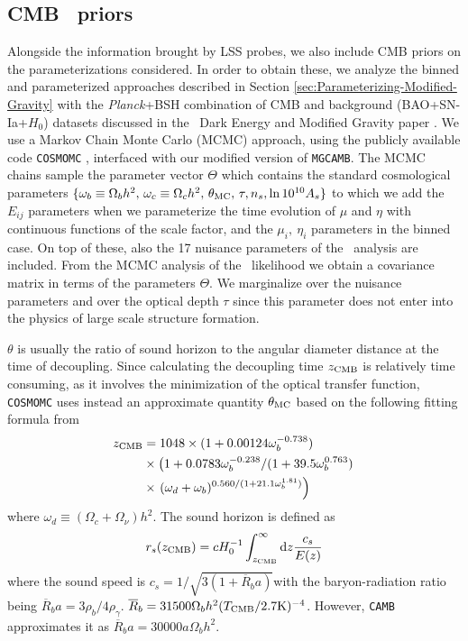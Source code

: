 \subsection{CMB \planck\ priors}
\label{sub:Fisher-Planck}
Alongside the information brought by LSS probes,
we also include CMB priors on the parameterizations considered. In
order to obtain these, we analyze the binned and parameterized approaches
described in Section \ref{sec:Parameterizing-Modified-Gravity} with
the {\it Planck}+BSH combination of CMB and background (BAO+SN-Ia+$H_{0}$)
datasets discussed in the \planck\ Dark Energy and Modified Gravity paper
\cite{planck_collaboration_planck_2016}.
We use a Markov Chain Monte Carlo (MCMC) approach, using the publicly
available code \texttt{COSMOMC} \cite{lewis_cosmological_2002,lewis_efficient_2013},
interfaced with our modified version of \texttt{MGCAMB}. The MCMC
chains sample the parameter vector $\Theta$ which contains the standard
cosmological parameters
$\{\omega_{b}\equiv\Omega_{b}h^{2},\,\omega_{c}\equiv\Omega_{c}h^{2},\,\theta_{\rm MC},\,\tau,n_{s},\ln{10^{10}A_{s}}\}$
to which we add the $E_{ij}$ parameters when we parameterize the time
evolution of $\mu$ and $\eta$ with continuous functions of the scale factor, 
and the $\mu_{i},\ \eta_{i}$ parameters in the binned
case. On top of these, also the 17 nuisance parameters of the \planck\
analysis are included. From the MCMC analysis of the \planck\ likelihood
we obtain a covariance matrix in terms of the parameters $\Theta$.
We marginalize over the nuisance parameters and over the optical
depth $\tau$ since this parameter does not enter into
the physics of large scale structure formation.

$\theta$ is usually the ratio of sound horizon
to the angular diameter distance at the time of decoupling. Since
calculating the decoupling time $z_{\rm CMB}$ is relatively time consuming,
as it involves the minimization of the optical transfer function,
\texttt{COSMOMC} uses instead an approximate quantity $\theta_{\rm MC}$
based on the following fitting formula from \cite{hu_small_1996}
\begin{align}
z_{\rm CMB} & =1048\times(1+0.00124\omega_{b}^{-0.738})\nonumber \\
 &
\times\left(1+0.0783\omega_{b}^{-0.238}/(1+39.5\omega_{b}^{0.763})\right.\nonumber
\\
 & \times\left.(\omega_{d}+\omega_{b})^{0.560/(1+21.1\omega_{b}^{1.81})}\right)
\end{align}
where $\omega_{d}\equiv(\Omega_{c}+\Omega_{\nu})h^{2}$.
The sound horizon is defined as 
\begin{equation}
r_{s}(z_{\rm CMB})=cH_{0}^{-1}\int_{z_{\rm CMB}}^{\infty}\mbox{d}z\frac{c_{s}}{E(z)}
\end{equation}
where the sound speed is $c_{s}=1/\sqrt{3(1+\overline{R}_{b}a)}$with
the baryon-radiation ratio being $\overline{R}_{b}a=3\rho_{b}/4\rho_{\gamma}$.
$\overline{R}_{b}=31500\Omega_{b}h^{2}(T_{\rm CMB}/2.7\mbox{K})^{-4}$.
However, \texttt{CAMB }approximates it as
$\overline{R}_{b}a=30000a\Omega_{b}h^{2}$.

